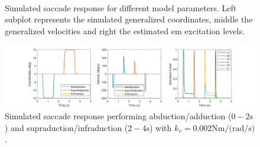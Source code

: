 \documentclass[11pt,a4paper,draft=false]{report}
\begin{document}
\begin{figure}[ht]
  \centering
    \\
  \caption{Simulated saccade response for different model parameters. Left
    subplot represents the simulated generalized coordinates, middle the
    generalized velocities and right the estimated \gls{em} excitation
    levels.}\label{fig:simulated-hor-saccade}
\end{figure}

\begin{figure}[ht]
  \centering
  \includegraphics[trim={3cm 0cm 2.8cm 0cm},clip,width=1.\textwidth]{complex_move.pdf}
  \caption{Simulated saccade response performing abduction/adduction
    ($0-2 \si{\s}$) and supraduction/infraduction ($2-4 \si{\s}$) with
    $k_v = 0.002 \si{\N \m / (\radian /
      \s)}$.}\label{fig:simulated-cmplx-saccade}
\end{figure}

\end{document}
